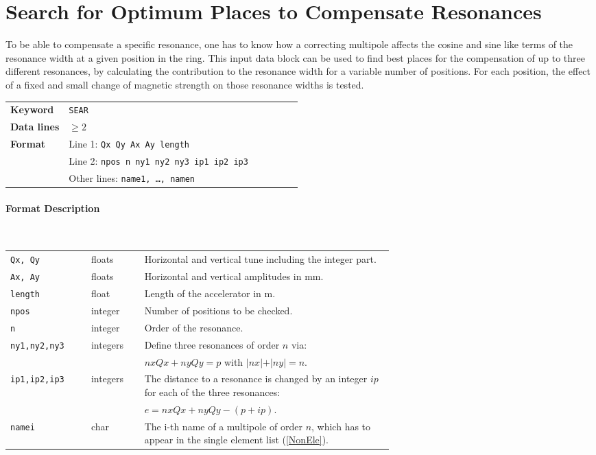\section{Search for Optimum Places to Compensate Resonances} \label{SeaPla}

To be able to compensate a specific resonance, one has to know how a correcting multipole affects the cosine and sine like terms of the resonance width at a given position in the ring.
This input data block can be used to find best places for the compensation of up to three different resonances, by calculating the contribution to the resonance width for a variable number of positions.
For each position, the effect of a fixed and small change of magnetic strength on those resonance widths is tested.

\bigskip
\begin{tabular}{@{}lp{0.8\linewidth}}
    \textbf{Keyword}    & \texttt{SEAR}\index{SEAR} \\
    \textbf{Data lines} & $\geq 2$ \\
    \textbf{Format}     & Line 1: \texttt{Qx Qy Ax Ay length} \\
                        & Line 2: \texttt{npos n ny1 ny2 ny3 ip1 ip2 ip3} \\
                        & Other lines: \texttt{name1, \dots , namen}
\end{tabular}

\paragraph{Format Description}~

\bigskip
\begin{longtabu}{@{}llp{0.65\linewidth}}
    \texttt{Qx, Qy}      & floats   & Horizontal and vertical tune including the integer part. \\
    \texttt{Ax, Ay}      & floats   & Horizontal and vertical amplitudes in mm. \\
    \texttt{length}      & float    & Length of the accelerator in m. \\
    \texttt{npos}        & integer  & Number of positions to be checked. \\
    \texttt{n}           & integer  & Order of the resonance. \\
    \texttt{ny1,ny2,ny3} & integers & Define three resonances of order $n$ via: \\
                         &          & \mbox{$nx Qx + ny Qy = p$} with \mbox{$\vert nx \vert + \vert ny \vert = n$}. \\
    \texttt{ip1,ip2,ip3} & integers & The distance to a resonance is changed by an integer $ip$ for each of the three resonances: \\
                         &          & \mbox{$e = nx Qx + ny Qy - (p + ip) $.} \\
    \texttt{namei}       & char     & The i-th name of a multipole of order $n$, which has to appear in the single element list (\ref{NonEle}).
\end{longtabu}

